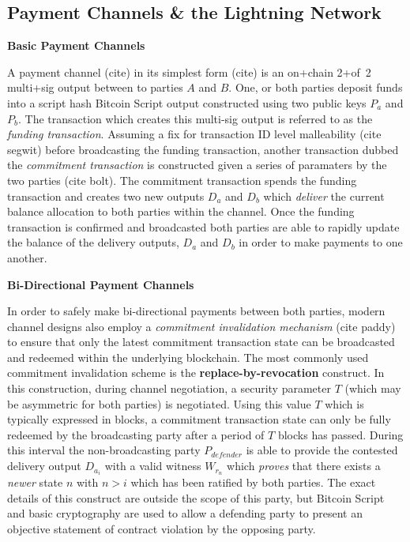 \documentclass[12pt,a4paper]{article}
\theoremstyle{definition}
\begin{document}
\subsection{Payment Channels \& the Lightning Network}

\begin{center}
\textbf{Basic Payment Channels}
\end{center}

A payment channel (cite) in its simplest form (cite) is an on+chain 2+of~2
multi+sig output between to parties $A$ and $B$. One, or both parties deposit
funds into a script hash Bitcoin Script output constructed using two public
keys $P_{a}$ and $P_{b}$. The transaction which creates this multi-sig output
is referred to as the \emph{funding transaction}. Assuming a fix for
transaction ID level malleability (cite segwit) before broadcasting the funding
transaction, another transaction dubbed the \emph{commitment transaction} is
constructed given a series of paramaters by the two parties (cite bolt). The
commitment transaction spends the funding transaction and creates two new
outputs $D_{a}$ and $D_{b}$ which \emph{deliver} the current balance allocation
to both parties within the channel. Once the funding transaction is confirmed
and broadcasted both parties are able to rapidly update the balance of the
delivery outputs, $D_{a}$ and $D_{b}$ in order to make payments to one another. \\

\begin{center}
\textbf{Bi-Directional Payment Channels}
\end{center}

In order to safely make bi-directional payments between both parties, modern
channel designs also employ a \emph{commitment invalidation mechanism} (cite
paddy) to ensure that only the latest commitment transaction state can be
broadcasted and redeemed within the underlying blockchain. The most commonly
used commitment invalidation scheme is the \textbf{replace-by-revocation}
construct. In this construction, during channel negotiation, a security
parameter $T$ (which may be asymmetric for both parties) is negotiated. Using
this value $T$ which is typically expressed in blocks, a commitment transaction
state can only be fully redeemed by the broadcasting party after a period of
$T$ blocks has passed. During this interval the non-broadcasting party
$P_{defender}$ is able to provide the contested delivery output $D_{a_i}$ with
a valid witness $W_{r_n}$ which \emph{proves} that there exists a  \emph{newer}
state $n$ with $n > i$ which has been ratified by both parties. The exact
details of this construct are outside the scope of this party, but Bitcoin
Script and basic cryptography are used to allow a defending party to present an
objective statement of contract violation by the opposing party. \\
\end{document}

